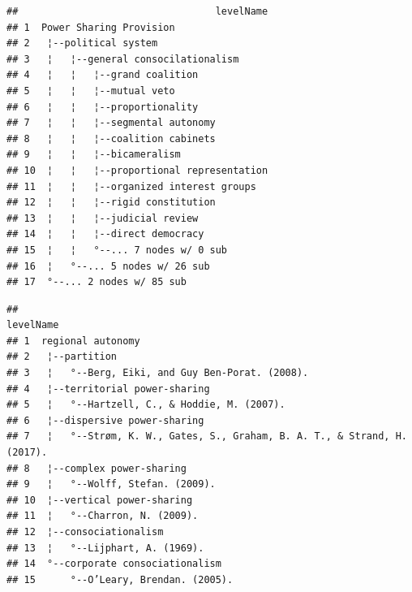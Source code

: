 \documentclass[
]{article}
\newenvironment{Shaded}{\begin{snugshade}}{\end{snugshade}}
\newcommand{\CommentTok}[1]{\textcolor[rgb]{0.56,0.35,0.01}{\textit{#1}}}
\newcommand{\DataTypeTok}[1]{\textcolor[rgb]{0.13,0.29,0.53}{#1}}
\newcommand{\DecValTok}[1]{\textcolor[rgb]{0.00,0.00,0.81}{#1}}
\newcommand{\KeywordTok}[1]{\textcolor[rgb]{0.13,0.29,0.53}{\textbf{#1}}}
\newcommand{\NormalTok}[1]{#1}
\newcommand{\OperatorTok}[1]{\textcolor[rgb]{0.81,0.36,0.00}{\textbf{#1}}}
\newcommand{\StringTok}[1]{\textcolor[rgb]{0.31,0.60,0.02}{#1}}
\begin{document}
\begin{verbatim}
##                                  levelName
## 1  Power Sharing Provision                
## 2   ¦--political system                   
## 3   ¦   ¦--general consocilationalism     
## 4   ¦   ¦   ¦--grand coalition            
## 5   ¦   ¦   ¦--mutual veto                
## 6   ¦   ¦   ¦--proportionality            
## 7   ¦   ¦   ¦--segmental autonomy         
## 8   ¦   ¦   ¦--coalition cabinets         
## 9   ¦   ¦   ¦--bicameralism               
## 10  ¦   ¦   ¦--proportional representation
## 11  ¦   ¦   ¦--organized interest groups  
## 12  ¦   ¦   ¦--rigid constitution         
## 13  ¦   ¦   ¦--judicial review            
## 14  ¦   ¦   ¦--direct democracy           
## 15  ¦   ¦   °--... 7 nodes w/ 0 sub       
## 16  ¦   °--... 5 nodes w/ 26 sub          
## 17  °--... 2 nodes w/ 85 sub
\end{verbatim}

\begin{Shaded}
\end{Shaded}

\begin{verbatim}
##                                                                  levelName
## 1  regional autonomy                                                      
## 2   ¦--partition                                                          
## 3   ¦   °--Berg, Eiki, and Guy Ben-Porat. (2008).                         
## 4   ¦--territorial power-sharing                                          
## 5   ¦   °--Hartzell, C., & Hoddie, M. (2007).                             
## 6   ¦--dispersive power-sharing                                           
## 7   ¦   °--Strøm, K. W., Gates, S., Graham, B. A. T., & Strand, H. (2017).
## 8   ¦--complex power-sharing                                              
## 9   ¦   °--Wolff, Stefan. (2009).                                         
## 10  ¦--vertical power-sharing                                             
## 11  ¦   °--Charron, N. (2009).                                            
## 12  ¦--consociationalism                                                  
## 13  ¦   °--Lijphart, A. (1969).                                           
## 14  °--corporate consociationalism                                        
## 15      °--O’Leary, Brendan. (2005).
\end{verbatim}
\end{document}
